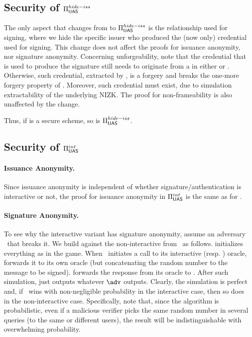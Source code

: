\subsection{Security of $\Pi_{\mathsf{UAS}}^{hide-iss}$}
\label{sapp:sec-hide-iss}

The only aspect that changes from \CUASGen to $\Pi_{\mathsf{UAS}}^{hide-iss}$ is the
relationship used for signing, where we hide the specific issuer who produced
the (now only) credential used for signing.
%
This change does not affect the proofs for issuance anonymity, nor signature
anonymity.
%
Concerning unforgeability, note that the credential that is used to produce the
\UAS signature still needs to originate from a \uid in either \HU or \CU.
Otherwise, such credential, extracted by \ExtractSign, is a forgery and breaks
the one-more forgery property of \SBCM. Moreover, such credential must exist,
due to simulation extractability of the underlying NIZK.
%
The proof for non-frameability is also unaffected by the change.

Thus, if \CUASGen is a secure \UAS scheme, so is $\Pi_{\mathsf{UAS}}^{hide-iss}$.

\subsection{Security of $\Pi_{\mathsf{UAS}}^{int}$}
\label{sapp:sec-interactive}

\paragraph{Issuance Anonymity.} Since issuance anonymity is independent of
whether signature/authentication is interactive or not, the proof for issuance
anonymity in $\Pi_{\mathsf{UAS}}^{int}$ is the same as for \CUASGen.

\paragraph{Signature Anonymity.} To see why the interactive variant has
signature anonymity, assume an adversary \adv~that breaks it. We build \advB
against the non-interactive \ExpSigAnonb from \adv~as follows. \advB initializes
everything as in the \ExpSigAnonb game. When \adv~initiates a call to its
interactive \SIGN (resp. \CHALb) oracle, \advB forwards it to its own oracle
(but concatenating the random number to the message to be signed). \advB
forwards the response from its oracle to \adv. After such simulation, \advB just
outputs whatever $\adv$ outputs. Clearly, the simulation is perfect and, if
\adv~wins with non-negligible probability in the interactive case, then so
does \advB in the non-interactive case. Specifically, note that, since the \Sign
algorithm is probabilistic, even if a malicious verifier picks the same random
number in several queries (to the same or different users), the result will be
indistinguishable with overwhelming probability.

